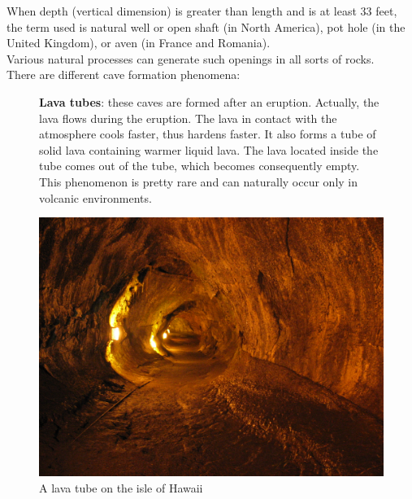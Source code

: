 \documentclass[draft, final]{report}
\begin{document}
When depth (vertical dimension) is greater than length and is at least 33 feet, the term used is natural well or open shaft (in North America), pot hole (in the United Kingdom), or aven (in France and Romania).\\

Various natural processes can generate such openings in all sorts of rocks. \\
There are different cave formation phenomena:\\
\begin{itemize}
  \begin{figure}[!ht]
    \begin{minipage}[c]{0.50\linewidth}
    \item \textbf{Lava tubes}: these caves are formed after an eruption. Actually, the lava flows during the eruption. The lava in contact with the atmosphere cools faster, thus hardens faster. It also forms a tube of solid lava containing warmer liquid lava. The lava located inside the tube comes out of the tube, which becomes consequently empty. This phenomenon is pretty rare and can naturally occur only in volcanic environments.
    \end{minipage} \hfill
    \begin{minipage}[c]{0.50\linewidth}
    \begin{center}
        \includegraphics[scale=0.25]{LateX/Images/lavatube.jpg}
        \caption{A lava tube on the isle of Hawaii\cite{lavatube}}
    \end{center}
    \end{minipage}
  \end{figure}

\end{itemize}
\end{document}
